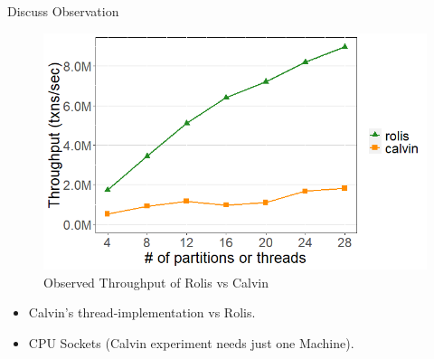 \documentclass[xcolor=dvipsnames]{beamer}
\begin{document}
    \begin{frame}{Discuss Observation}

        \begin{figure}
            \includegraphics[scale=0.4]{fig12.png}
            \caption{Observed Throughput of Rolis vs Calvin}
        \end{figure}

        \begin{itemize}
            \item Calvin's thread-implementation vs Rolis.
            \item CPU Sockets (Calvin experiment needs just one Machine).
        \end{itemize}


    \end{frame}
\end{document}
